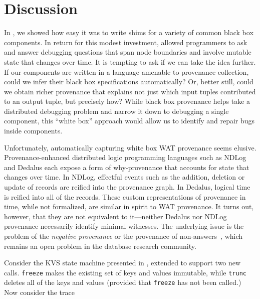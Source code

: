 \section{Discussion}

In , we showed how easy it was to write shims 
for a variety of common black box components.  In return for this modest 
investment, \fluent{}  allowed programmers to ask and answer debugging questions 
that span node boundaries and involve mutable state that changes over time. 
It is tempting to ask if we can take the idea further.  If our components are 
written in a language amenable to provenance collection, could we infer their 
black box specifications automatically?  Or, better still, could we obtain 
richer provenance that explains not just which input tuples contributed to 
an output tuple, but precisely how?  While black box provenance helps take 
a distributed debugging problem and narrow it down to debugging a single 
component, this ``white box'' approach would allow us to identify and repair 
bugs inside components.

Unfortunately, automatically capturing white box WAT provenance seems elusive.  
Provenance-enhanced distributed logic programming languages such as NDLog and 
Dedalus each expose a form of why-provenance that accounts for state that 
changes over time.  In NDLog, effectful events such as the addition, deletion or update of records are reified into the provenance graph.  In Dedalus, logical 
time is reified into all of the records.  These custom representations of 
provenance in time, while not formalized, are similar in spirit to WAT provenance.  
It turns out, however, that they are not equivalent to it---neither Dedalus nor 
NDLog provenance necessarily identify minimal witnesses.  The underlying issue 
is the problem of the \emph{negative provenance} or the provenance of 
non-answers~\cite{chapman2009whynot,huang2008nonanswers}, which remains an open problem in 
the database research community.  

\newcommand{\kvset}{\text{set}}
\newcommand{\kvget}{\text{get}}
\newcommand{\freeze}{\text{freeze}}
\newcommand{\trunc}{\text{trunc}}

Consider the KVS state machine presented in , extended to support two new calls.   \texttt{freeze} makes the existing set of keys and values immutable, while \texttt{trunc} deletes all of the keys and values (provided that \texttt{freeze} has not been called.)  Now consider the trace 

